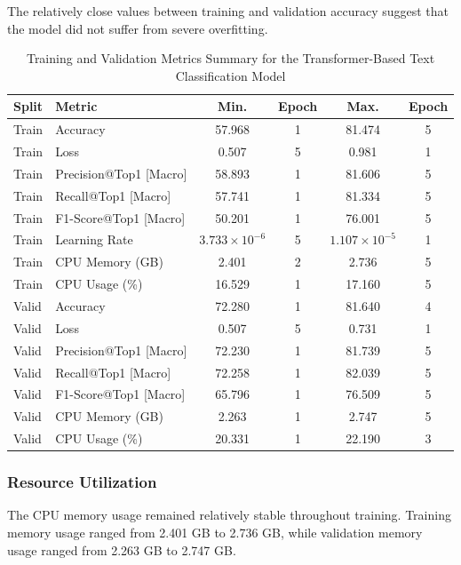 \documentclass{ieeeaccess}
\begin{document}
The relatively close values between training and validation accuracy suggest that the model did not suffer from severe overfitting.

\begin{table}[t!]
\centering
\caption{Training and Validation Metrics Summary for the Transformer-Based Text Classification Model}
\begin{tabular}{|l|l|c|c|c|c|}
\hline
\textbf{Split} & \textbf{Metric} & \textbf{Min.} & \textbf{Epoch} & \textbf{Max.} & \textbf{Epoch} \\
\hline
Train & Accuracy & 57.968 & 1 & 81.474 & 5 \\
Train & Loss & 0.507 & 5 & 0.981 & 1 \\
Train & Precision@Top1 [Macro] & 58.893 & 1 & 81.606 & 5 \\
Train & Recall@Top1 [Macro] & 57.741 & 1 & 81.334 & 5 \\
Train & F1-Score@Top1 [Macro] & 50.201 & 1 & 76.001 & 5 \\
Train & Learning Rate & $3.733 \times 10^{-6}$ & 5 & $1.107 \times 10^{-5}$ & 1 \\
Train & CPU Memory (GB) & 2.401 & 2 & 2.736 & 5 \\
Train & CPU Usage (\%) & 16.529 & 1 & 17.160 & 5 \\
\hline
Valid & Accuracy & 72.280 & 1 & 81.640 & 4 \\
Valid & Loss & 0.507 & 5 & 0.731 & 1 \\
Valid & Precision@Top1 [Macro] & 72.230 & 1 & 81.739 & 5 \\
Valid & Recall@Top1 [Macro] & 72.258 & 1 & 82.039 & 5 \\
Valid & F1-Score@Top1 [Macro] & 65.796 & 1 & 76.509 & 5 \\
Valid & CPU Memory (GB) & 2.263 & 1 & 2.747 & 5 \\
Valid & CPU Usage (\%) & 20.331 & 1 & 22.190 & 3 \\
\hline
\end{tabular}
\label{tab:transformer_text_classification_metrics}
\end{table}

\subsubsection{Resource Utilization}

The CPU memory usage remained relatively stable throughout training. Training memory usage ranged from 2.401 GB to 2.736 GB, while validation memory usage ranged from 2.263 GB to 2.747 GB.
\end{document}
